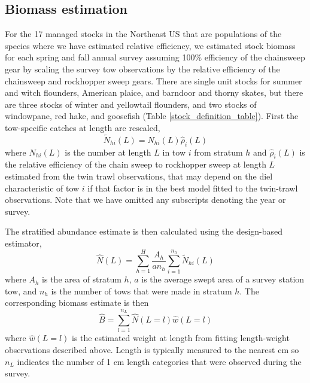 \documentclass[]{article}
\begin{document}
\hypertarget{biomass-estimation}{%
\subsection{Biomass estimation}\label{biomass-estimation}}

For the 17 managed stocks in the Northeast US that are populations of
the species where we have estimated relative efficiency, we estimated
stock biomass for each spring and fall annual survey assuming 100\%
efficiency of the chainsweep gear by scaling the survey tow observations
by the relative efficiency of the chainsweep and rockhopper sweep gears.
There are single unit stocks for summer and witch flounders, American
plaice, and barndoor and thorny skates, but there are three stocks of
winter and yellowtail flounders, and two stocks of windowpane, red hake,
and goosefish (Table \ref{stock_definition_table}). First the
tow-specific catches at length are rescaled, \begin{equation}\label{nal}
\widetilde N_{hi}\left(L\right) = N_{hi}\left(L\right)\widehat \rho_i\left(L\right)
\end{equation} where \(N_{hi}(L)\) is the number at length \(L\) in tow
\(i\) from stratum \(h\) and \(\widehat \rho_i\left(L\right)\) is the
relative efficiency of the chain sweep to rockhopper sweep at length
\(L\) estimated from the twin trawl observations, that may depend on the
diel characteristic of tow \(i\) if that factor is in the best model
fitted to the twin-trawl observations. Note that we have omitted any
subscripts denoting the year or survey.

The stratified abundance estimate is then calculated using the
design-based estimator, \begin{equation}\label{Nal_estimate}
 \widehat N(L) = \sum^H_{h=1} \frac{A_h}{an_h}\sum^{n_h}_{i=1} \widetilde N_{hi}(L)
\end{equation} where \(A_h\) is the area of stratum \(h\), \(a\) is the
average swept area of a survey station tow, and \(n_h\) is the number of
tows that were made in stratum \(h\). The corresponding biomass estimate
is then \begin{equation}\label{biomass_estimate}
 \widehat B = \sum^{n_L}_{l=1} \widehat N(L = l) \widehat w(L=l)
\end{equation} where \(\widehat w(L=l)\) is the estimated weight at
length from fitting length-weight observations described above. Length
is typically measured to the nearest cm so \(n_L\) indicates the number
of 1 cm length categories that were observed during the survey.
\end{document}
